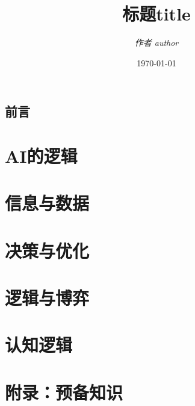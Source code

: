 \documentclass[11pt,a5paper,oneside,fontset=none]{ctexbook}
\title{\bfseries\Huge 标题title}
\author{\itshape\Large 作者 author}
\date{\today}
\begin{document}
\frontmatter
\pagestyle{empty}
\maketitle
\cleardoublepage
\setcounter{page}{1}
\chapter{前言}
\tableofcontents
\mainmatter
\pagestyle{plain}

\part{AI的逻辑}



\part{信息与数据}




\part{决策与优化}




\part{逻辑与博弈}



\part{认知逻辑}



\appendix
\part{附录：预备知识}




\backmatter


\printindex
\end{document}
